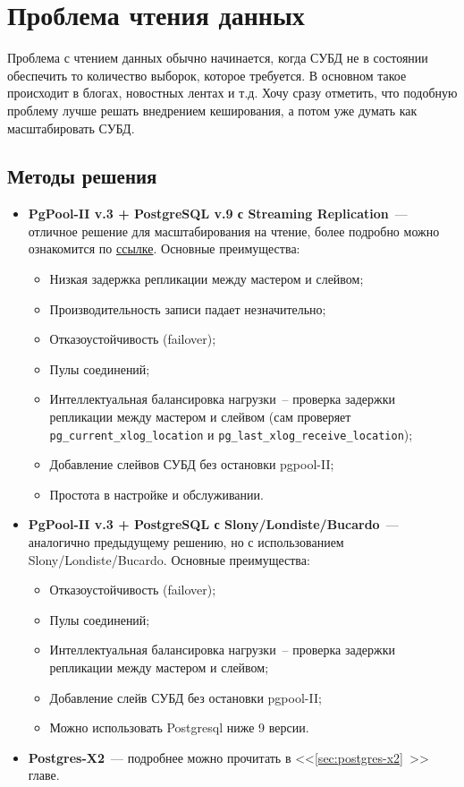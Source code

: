 \section{Проблема чтения данных}

Проблема с чтением данных обычно начинается, когда СУБД не в состоянии обеспечить то количество выборок, которое требуется. В основном такое происходит в блогах, новостных лентах и т.д. Хочу сразу отметить, что подобную проблему лучше решать внедрением кеширования, а потом уже думать как масштабировать СУБД.

\subsection{Методы решения}

\begin{itemize}
  \item \textbf{PgPool-II v.3 + PostgreSQL v.9 с Streaming Replication}~--- отличное решение для масштабирования на чтение, более подробно можно ознакомится по \href{http://pgpool.projects.pgfoundry.org/contrib\_docs/simple\_sr\_setting/index.html}{ссылке}. Основные преимущества:

  \begin{itemize}
    \item Низкая задержка репликации между мастером и слейвом;
    \item Производительность записи падает незначительно;
    \item Отказоустойчивость (failover);
    \item Пулы соединений;
    \item Интеллектуальная балансировка нагрузки~-- проверка задержки репликации между мастером и слейвом (сам проверяет \lstinline!pg_current_xlog_location! и \lstinline!pg_last_xlog_receive_location!);
    \item Добавление слейвов СУБД без остановки pgpool-II;
    \item Простота в настройке и обслуживании.
  \end{itemize}

  \item \textbf{PgPool-II v.3 + PostgreSQL с Slony/Londiste/Bucardo}~--- аналогично предыдущему решению, но с использованием Slony/Londiste/Bucardo. Основные преимущества:

  \begin{itemize}
    \item Отказоустойчивость (failover);
    \item Пулы соединений;
    \item Интеллектуальная балансировка нагрузки~-- проверка задержки репликации между мастером и слейвом;
    \item Добавление слейв СУБД без остановки pgpool-II;
    \item Можно использовать Postgresql ниже 9 версии.
  \end{itemize}

  \item \textbf{Postgres-X2}~--- подробнее можно прочитать в <<\ref{sec:postgres-x2}~>> главе.
\end{itemize}
